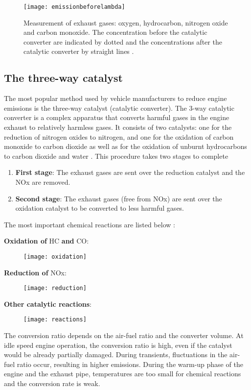 \begin{figure}[H]
    \centering
    \texttt{[image: emissionbeforelambda]}
    \caption{Measurement of exhaust gases: oxygen, hydrocarbon, nitrogen oxide and carbon monoxide. The concentration before the catalytic converter are indicated by dotted and the concentrations after the catalytic converter by straight lines \cite{kiencke2005automotive}.}
    \label{fig:emissionbeforelambda}
\end{figure}

\subsection{The three-way catalyst}
The most popular method used by vehicle manufacturers to reduce engine emissions is the three-way catalyst (catalytic converter). The 3-way catalytic converter is a complex apparatus that converts harmful gases in the engine exhaust to relatively harmless gases. It consists of two catalysts: one for the reduction of nitrogen oxides to nitrogen, and one for the oxidation of carbon monoxide to carbon dioxide as well as for the oxidation of unburnt hydrocarbons to carbon dioxide and water \cite{chang1996novel}. 
This procedure takes two stages to complete
\begin{enumerate}
\item \textbf{First stage}: The exhaust gases are sent over the reduction catalyst and the NOx are removed.
\item \textbf{Second stage}: The exhaust gases (free from NOx) are sent over the oxidation catalyst to be converted to less harmful gases.
\end{enumerate}
The most important chemical reactions are listed below    \cite{kiencke2005automotive}:

\textbf{Oxidation of} HC \textbf{and} CO:
\begin{figure}[H]
    \centering
    \texttt{[image: oxidation]}
\end{figure}

\textbf{Reduction of} NOx:
\begin{figure}[H]
    \centering
    \texttt{[image: reduction]}
\end{figure}

\textbf{Other catalytic reactions}:
\begin{figure}[H]
    \centering
    \texttt{[image: reactions]}
\end{figure}


The conversion ratio depends on the air-fuel ratio and the converter volume. At idle speed engine operation, the conversion ratio is high, even if the catalyst would be already partially damaged. During transients, fluctuations in the air-fuel ratio occur, resulting in higher emissions. During the warm-up phase of the engine and the exhaust pipe, temperatures are too small for chemical reactions and the conversion rate is weak.

